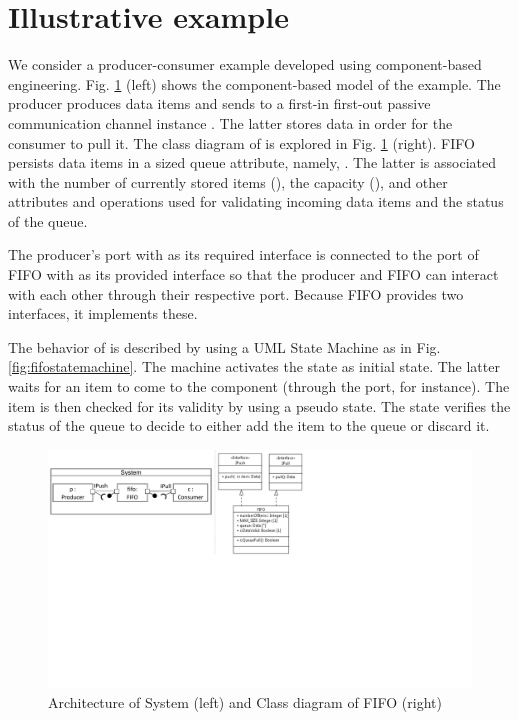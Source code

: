 \section{Illustrative example%
	}
\label{sec:motivation}

We consider a producer-consumer example developed using component-based engineering.
Fig. \ref{fig:cbseexample} (left) shows the component-based model of the example.
The  producer produces data items and sends to a first-in first-out passive communication channel instance .
The latter stores data in order for the consumer to pull it.
The class diagram of  is explored in Fig. \ref{fig:cbseexample} (right).
FIFO persists data items in a sized queue attribute, namely, .
The latter is associated with the number of currently stored items (), the capacity (), and other attributes and operations used for validating incoming data items and the status of the queue.

The producer's port with  as its required interface is connected to the port of FIFO with  as its provided interface so that the producer and FIFO can interact with each other through their respective port.
Because FIFO provides two interfaces, it implements these.

The behavior of  is described by using a UML State Machine as in Fig. \ref{fig:fifostatemachine}.
The machine activates the  state as initial state.
The latter waits for an item to come to the  component (through the  port, for instance).
The item is then checked for its validity by using a  pseudo state.
The  state verifies the status of the queue to decide to either add the item to the queue or discard it.  


\begin{figure}
	\centering
	\includegraphics[clip, trim=0cm 10.3cm 13.3cm 0cm, width=\columnwidth]{figures/cbseexample.pdf}
	\caption{Architecture of System (left) and Class diagram of FIFO (right)} 
	\label{fig:cbseexample}
\end{figure}


